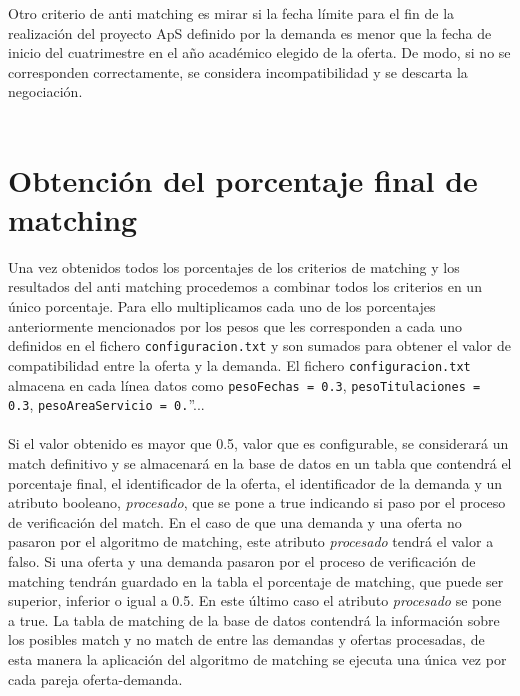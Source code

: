 \documentclass[11pt]{book}
\begin{document}
Otro criterio de anti matching es mirar si la fecha límite para el fin de la realización del proyecto ApS definido por la demanda es menor que la fecha de inicio del cuatrimestre en el año académico elegido de la oferta. De modo, si no se corresponden correctamente, se considera incompatibilidad y se descarta la negociación. \\\\



\section{Obtención del porcentaje final de matching}

Una vez obtenidos todos los porcentajes de los criterios de matching y los resultados del anti matching procedemos a combinar todos los criterios en un único porcentaje. Para ello multiplicamos cada uno de los porcentajes anteriormente mencionados por los pesos que les corresponden a cada uno definidos en el fichero \texttt{configuracion.txt} y son sumados para obtener el valor de compatibilidad entre la oferta y la demanda. El fichero \texttt{configuracion.txt} almacena en cada línea datos como \texttt{pesoFechas = 0.3}, \texttt{pesoTitulaciones = 0.3}, \texttt{pesoAreaServicio = 0.}”...  \\\\

Si el valor obtenido es mayor que 0.5, valor que es configurable, se considerará un match definitivo y se almacenará en la base de datos en un tabla que contendrá el porcentaje final, el identificador de la oferta, el identificador de la demanda y un atributo booleano, \emph{procesado}, que se pone a true indicando si paso por el proceso de verificación del match. En el caso de que una demanda y una oferta no pasaron por el algoritmo de matching, este atributo \emph{procesado} tendrá el valor a falso. Si una oferta y una demanda pasaron por el proceso de verificación de matching tendrán guardado en la tabla el porcentaje de matching, que puede ser superior, inferior o igual a 0.5. En este último caso el atributo \emph{procesado} se pone a true. La tabla de matching de la base de datos contendrá la información sobre los posibles match y no match de entre las demandas y ofertas procesadas, de esta manera la aplicación del algoritmo de matching se ejecuta una única vez por cada pareja oferta-demanda. \\\\
\end{document}
